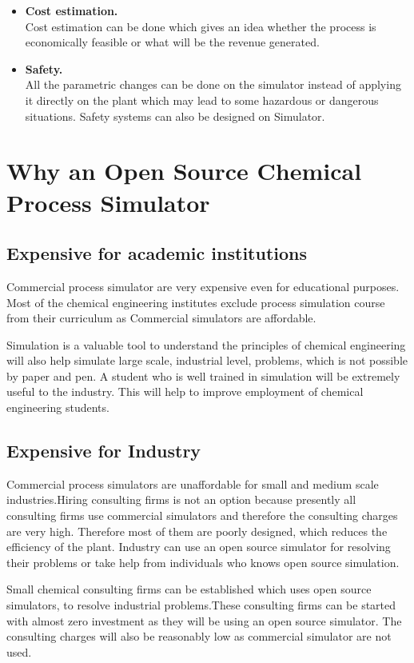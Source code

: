 \documentclass[12pt]{report}
\begin{document}
\begin{itemize}
\item{\textbf{Cost estimation.}} \\
Cost estimation can be done which gives an idea whether the process is economically feasible or what will be the revenue generated.

\item{\textbf{Safety.}} \\
All the parametric changes can be done on the simulator instead of applying it directly on the plant which may lead to some hazardous or dangerous situations. Safety systems can also be designed on Simulator.
\end{itemize}

\section{Why an Open Source Chemical Process Simulator}

\subsection{Expensive for academic institutions}
Commercial process simulator are very expensive even for educational purposes. Most of the chemical engineering institutes exclude process simulation course from their curriculum as Commercial simulators are affordable.

Simulation is a valuable tool to understand the principles of chemical engineering will also help simulate large scale, industrial level, problems, which is not possible by paper and pen. A student who is well trained in simulation will be extremely useful to the industry. This will help to improve employment of chemical engineering students.

\subsection{Expensive for Industry}
Commercial process simulators are unaffordable for small and medium scale industries.Hiring consulting firms is not an option because presently all consulting firms use commercial simulators and therefore the consulting charges are very high. Therefore most of them are poorly designed, which reduces the efficiency of the plant. Industry can use an open source simulator for resolving their problems or take help from individuals who knows open source simulation.

Small chemical consulting firms can be established which uses open source simulators, to resolve industrial problems.These consulting firms can be started with almost zero investment as they will be using an open source simulator. The consulting charges will also be reasonably low as commercial simulator are not used.
\end{document}
